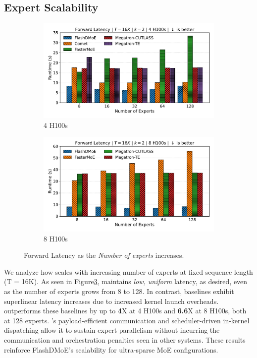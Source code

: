 \subsection{Expert Scalability}\label{subsec:expert-scalability}
\begin{figure}[!h]
    \centering
    \begin{subfigure}{0.49\textwidth}
        \centering
        \includegraphics[width=\linewidth, keepaspectratio]{figures/scaling_experts}
        \caption{4 H100s}
        \label{sub:4gx}
    \end{subfigure}
    \begin{subfigure}{0.49\textwidth}
        \centering
        \includegraphics[width=\linewidth, keepaspectratio]{figures/scaling_experts_8}
        \caption{8 H100s}
        \label{sub:8gx}
    \end{subfigure}
    \caption{Forward Latency as the \emph{Number of experts} increases.}
    \label{fig:xs}
\end{figure}
We analyze how \sysname scales with increasing number of experts at fixed sequence length (T = 16K).
As seen in Figure\ref{fig:xs}, \sysname maintains \emph{low, uniform} latency, as desired,
even as the number of experts grows from 8 to 128.
In contrast, baselines exhibit superlinear latency increases due to increased kernel launch overheads.
\sysname outperforms these baselines by up to \textbf{4}X at 4 H100s and \textbf{6.6}X at 8 H100s, both at 128 experts.
\sysname’s payload-efficient communication and scheduler-driven
in-kernel dispatching allow it to sustain expert parallelism
without incurring the communication and orchestration penalties seen in other systems.
These results reinforce FlashDMoE’s scalability for ultra-sparse MoE configurations.

